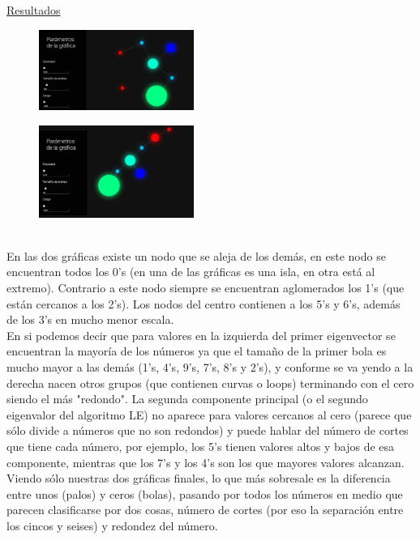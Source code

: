 \documentclass[12pt]{article}
\newcommand{\noi}{\noindent}
\begin{document}
{\underline{\large{Resultados}}}\\
\begin{figure}[h!]
\includegraphics[trim={5cm .5cm 5cm .5cm},width=0.45\textwidth]{graf_iso}
\centering
\end{figure}
\begin{figure}[h!]
\includegraphics[trim={5cm .5cm 5cm .5cm},width=0.45\textwidth]{graf_uni}
\centering
\end{figure}\\
\noi En las dos gr\'aficas existe un nodo que se aleja de los dem\'as, en este nodo se encuentran todos los 0's (en una de las gr\'aficas es una isla, en otra est\'a al extremo). Contrario a este nodo siempre se encuentran aglomerados los 1's (que est\'an cercanos a los 2's). Los nodos del centro contienen a los 5's y 6's, adem\'as de los 3's en mucho menor escala.\\
\indent En si podemos decir que para valores en la izquierda del primer eigenvector se encuentran la mayor\'ia de los n\'umeros ya que el tama\~{n}o de la primer bola es mucho mayor a las dem\'as (1's, 4's, 9's, 7's, 8's y 2's), y conforme se va yendo a la derecha nacen otros grupos (que contienen curvas o loops) terminando con el cero siendo el m\'as "redondo". La segunda componente principal (o el segundo eigenvalor del algoritmo LE) no aparece para valores cercanos al cero (parece que s\'olo divide a n\'umeros que no son redondos) y puede hablar del n\'umero de cortes que tiene cada n\'umero, por ejemplo, los 5's tienen valores altos y bajos de esa componente, mientras que los 7's y los 4's son los que mayores valores alcanzan.\\
\indent Viendo s\'olo nuestras dos gr\'aficas finales, lo que m\'as sobresale es la diferencia entre unos (palos) y ceros (bolas), pasando por todos los n\'umeros en medio que parecen clasificarse por dos cosas, n\'umero de cortes (por eso la separaci\'on entre los cincos y seises) y redondez del n\'umero. 
\end{document}

